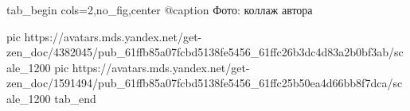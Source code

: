  
 
 
 
 


\ifcmt
  tab_begin cols=2,no_fig,center
		 @caption Фото: коллаж автора

     pic https://avatars.mds.yandex.net/get-zen_doc/4382045/pub_61ffb85a07fcbd5138fe5456_61ffc26b3dc4d83a2b0bf3ab/scale_1200
		 pic https://avatars.mds.yandex.net/get-zen_doc/1591494/pub_61ffb85a07fcbd5138fe5456_61ffc25b50ea4d66bb8f7dca/scale_1200
  tab_end
\fi
